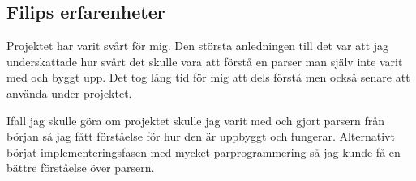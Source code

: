 \documentclass{TDP003mall}
\begin{document}
\subsection{Filips erfarenheter}
Projektet har varit svårt för mig. Den största anledningen till det var att jag underskattade hur svårt det skulle vara att förstå en parser man själv inte varit med och byggt upp. Det tog lång tid för mig att dels förstå men också senare att använda under projektet.

Ifall jag skulle göra om projektet skulle jag varit med och gjort parsern från början så jag fått förståelse för hur den är uppbyggt och fungerar. Alternativt börjat implementeringsfasen med mycket parprogrammering så jag kunde få en bättre förståelse över parsern.  
\end{document}
